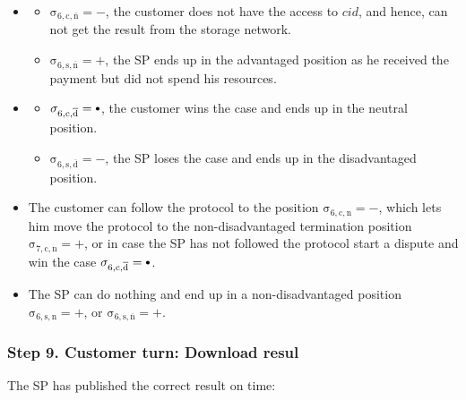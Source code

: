 \documentclass{ieeeaccess}
\newcommand\neutral[1][.75]{\mathbin{\ThisStyle{\vcenter{\hbox{%
  \scalebox{#1}{$\SavedStyle\bullet$}}}}}%
}
\begin{document}
\begin{itemize}
\item \AgreeablePath
  \begin{itemize}
    \item \(\operatorname{\sigma_{6, c, \overline{n}} = -}\), the customer does not have the access to $cid$, and hence, can not get the result from the storage network.
    \item \(\operatorname{\sigma_{6, s, \overline{n}} = +}\), the SP ends up in the advantaged position as he received the payment but did not spend his resources.
  \end{itemize}
\item \DisputePath
  \begin{itemize}
    \item \(\operatorname{\sigma_{6, c, \overline{d}} = \neutral}\), the customer wins the case and ends up in the neutral position.
    \item \(\operatorname{\sigma_{6, s, \overline{d}} = -}\), the SP loses the case and ends up in the disadvantaged position.
  \end{itemize}
\end{itemize}

\Fairness

\begin{itemize}
  \item The customer can follow the protocol to the position \(\operatorname{\sigma_{6, c, n} = -}\), which lets him move the protocol to the non-disadvantaged termination position \(\operatorname{\sigma_{7, c, n} = +}\), or in case the SP has not followed the protocol start a dispute and win the case \(\operatorname{\sigma_{6, c, \overline{d}} = \neutral}\).
  \item The SP can do nothing and end up in a non-disadvantaged position \(\operatorname{\sigma_{6, s, n} = +}\), or \(\operatorname{\sigma_{6, s, \overline{n}} = +}\).
\end{itemize}

\subsubsection{Step 9. Customer turn: Download resul}\label{step-9-retrieval-of-results}

The SP has published the correct result on time:
\end{document}
